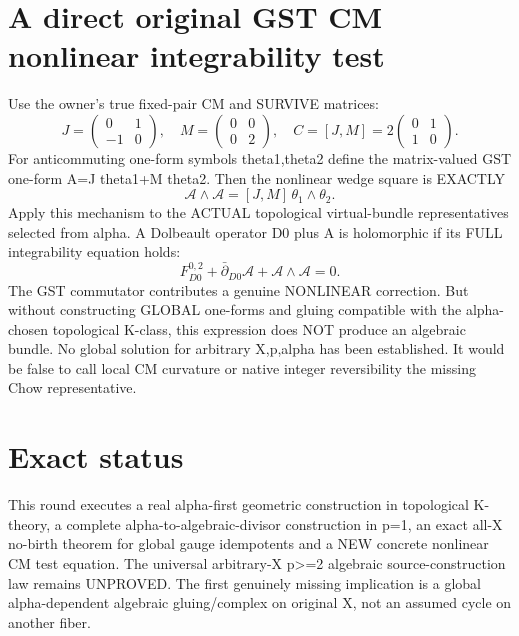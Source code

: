 \documentclass{article}
\begin{document}
\section{A direct original GST CM nonlinear integrability test}
Use the owner's true fixed-pair CM and SURVIVE matrices:
\[
J=\begin{pmatrix}0&1\\-1&0\end{pmatrix},\quad
M=\begin{pmatrix}0&0\\0&2\end{pmatrix},\quad
C=[J,M]=2\begin{pmatrix}0&1\\1&0\end{pmatrix}.
\]
For anticommuting one-form symbols theta1,theta2 define
the matrix-valued GST one-form A=J theta1+M theta2.
Then the nonlinear wedge square is EXACTLY
\[
\boxed{\mathcal A\wedge\mathcal A
=[J,M]\,\theta_1\wedge\theta_2.}
\]
Apply this mechanism to the ACTUAL topological virtual-bundle
representatives selected from alpha. A Dolbeault operator
D0 plus A is holomorphic if its FULL integrability equation holds:
\[
\boxed{F_{D0}^{0,2}+\bar\partial_{D0}\mathcal A+
\mathcal A\wedge\mathcal A=0.}
\]
The GST commutator contributes a genuine NONLINEAR correction.
But without constructing GLOBAL one-forms and gluing compatible with
the alpha-chosen topological K-class, this expression does NOT
produce an algebraic bundle. No global solution for arbitrary X,p,alpha
has been established. It would be false to call local CM curvature
or native integer reversibility the missing Chow representative.

\section{Exact status}
This round executes a real alpha-first geometric construction in
topological K-theory, a complete alpha-to-algebraic-divisor
construction in p=1, an exact all-X no-birth theorem for global
gauge idempotents and a NEW concrete nonlinear CM test equation.
The universal arbitrary-X p>=2 algebraic source-construction law
remains UNPROVED. The first genuinely missing implication is a
global alpha-dependent algebraic gluing/complex on original X,
not an assumed cycle on another fiber.
\end{document}
